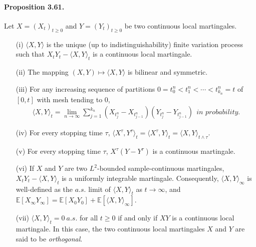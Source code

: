 \documentclass{article}
\numberwithin{equation}{section}
\newcommand{\E}{\mathbb{E}}
\theoremstyle{plain}
\theoremstyle{definition}
\begin{document}
\paragraph{Proposition 3.61.\label{prop:3.61}}  Let $X=(X_t)_{t\geq 0}$ and $Y=(Y_t)_{t\geq 0}$ be two continuous local martingales.
\begin{itemize}
	\item[(i)] $\langle X,Y\rangle$ is the unique (up to indistinguishability) finite variation process such that $X_tY_t-\langle X,Y\rangle_t$ is a continuous local martingale.
	\item[(ii)] The mapping $(X,Y)\mapsto\langle X,Y\rangle$ is bilinear and symmetric.
	\item[(iii)] For any increasing sequence of partitions $0=t_0^n<t_1^n<\cdots<t_{k_n}^n=t$ of $[0,t]$ with mesh tending to $0$,
	\begin{align*}
		\langle X,Y\rangle_t = \lim_{n\to\infty}\sum_{j=1}^{k_n}(X_{t_j^n}-X_{t_{j-1}^n})(Y_{t_j^n}-Y_{t_{j-1}^n})\ \ \textit{in probability}.
	\end{align*}
    \item[(iv)] For every stopping time $\tau$, $\langle X^\tau,Y^\tau\rangle_t = \langle X^\tau,Y\rangle_t = \langle X,Y\rangle_{t\wedge\tau}$.
    \item[(v)] For every stopping time $\tau$, $X^\tau(Y-Y^\tau)$ is a continuous martingale.
    \item[(vi)] If $X$ and $Y$ are two $L^2$-bounded sample-continuous martingales, $X_tY_t-\langle X,Y\rangle_t$ is a uniformly integrable martingale. Consequently, $\langle X,Y\rangle_\infty$ is well-defined as the $a.s.$ limit of $\langle X,Y\rangle_t$ as $t\to\infty$, and $\E[X_\infty Y_\infty]=\E[X_0Y_0]+\E[\langle X,Y\rangle_\infty]$.
    \item[(vii)] $\langle X,Y\rangle_t=0\ a.s.$ for all $t\geq 0$ if and only if $XY$ is a continuous local martingale. In this case, the two continuous local martingales $X$ and $Y$ are said to be \textit{orthogonal}.
\end{itemize}
\end{document}
